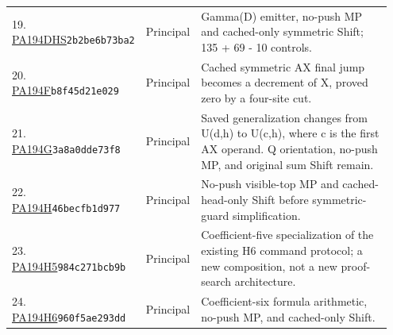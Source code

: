 \begin{longtable}{@{}p{0.27\linewidth}p{0.13\linewidth}p{0.55\linewidth}@{}}
19. \href{https://github.com/VladimirReshetnikov/ProveIt/blob/32d0d8b7d93a63ad4106c18cdb29b37927acdad2/Computability/BusyBeaver/Research/PA/docs/pa194dhs_conpa_2026-11-13/machine/machine.tm}{PA194DHS}\newline\texttt{2b2be6b73ba2} & Principal & Gamma(D) emitter, no-push MP and cached-only symmetric Shift; 135 + 69 - 10 controls.\\[5pt]
20. \href{https://github.com/VladimirReshetnikov/ProveIt/blob/32d0d8b7d93a63ad4106c18cdb29b37927acdad2/Computability/BusyBeaver/Research/PA/docs/PA194R_research_2026-11-14/machines/PA194F/machine.tm}{PA194F}\newline\texttt{b8f45d21e029} & Principal & Cached symmetric AX final jump becomes a decrement of X, proved zero by a four-site cut.\\[5pt]
21. \href{https://github.com/VladimirReshetnikov/ProveIt/blob/32d0d8b7d93a63ad4106c18cdb29b37927acdad2/Computability/BusyBeaver/Research/PA/docs/PA194B_PA194G_research_2026-11-14/generalizer/machine.tm}{PA194G}\newline\texttt{3a8a0dde73f8} & Principal & Saved generalization changes from U(d,h) to U(c,h), where c is the first AX operand. Q orientation, no-push MP, and original sum Shift remain.\\[5pt]
22. \href{https://github.com/VladimirReshetnikov/ProveIt/blob/32d0d8b7d93a63ad4106c18cdb29b37927acdad2/Computability/BusyBeaver/Research/PA/docs/pa194hs_conpa_2026-11-13/machines/PA194H/machine.tm}{PA194H}\newline\texttt{46becfb1d977} & Principal & No-push visible-top MP and cached-head-only Shift before symmetric-guard simplification.\\[5pt]
23. \href{https://github.com/VladimirReshetnikov/ProveIt/blob/32d0d8b7d93a63ad4106c18cdb29b37927acdad2/Computability/BusyBeaver/Research/PA/docs/pa194h5_research_2026-11-14/machine/machine.tm}{PA194H5}\newline\texttt{984c271bcb9b} & Principal & Coefficient-five specialization of the existing H6 command protocol; a new composition, not a new proof-search architecture.\\[5pt]
24. \href{https://github.com/VladimirReshetnikov/ProveIt/blob/32d0d8b7d93a63ad4106c18cdb29b37927acdad2/Computability/BusyBeaver/Research/PA/docs/pa194h6_conpa_2026-11-13/machine/machine.tm}{PA194H6}\newline\texttt{960f5ae293dd} & Principal & Coefficient-six formula arithmetic, no-push MP, and cached-only Shift.\\[5pt]

\end{longtable}
